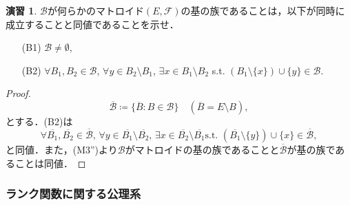 \documentclass[xelatex,ja=standard,a4paper,14pt,everyparhook=compat]{bxjsarticle}
\theoremstyle{definition}
\newtheorem{exercise}{演習}
\begin{document}
\setcounter{exercise}{7}
\begin{exercise}
    $\mathcal{B}$が何らかのマトロイド$(E, \mathcal{F})$の基の族であることは，以下が同時に成立することと同値であることを示せ． \begin{enumerate}
        \item[(B1)] $\mathcal{B} \neq \emptyset$,
        \item[(B2)] $\forall B_1, B_2 \in \mathcal{B}$, $\forall y \in B_2 \setminus B_1$, $\exists x \in B_1 \setminus B_2$ s.t. $(B_1 \setminus \{x\}) \cup \{y\} \in \mathcal{B}$.
    \end{enumerate}
\end{exercise}
\begin{proof}
    \begin{equation*}
        \overline{\mathcal{B}} \coloneqq \{\overline{B} : B \in \mathcal{B}\} \quad (\overline{B} = E \setminus B),
    \end{equation*}
    とする．(B2)は \begin{equation*}
        \text{$\forall \overline{B_1}, \overline{B_2} \in \overline{\mathcal{B}}$,
            $\forall y \in \overline{B_1} \setminus \overline{B_2}$,
            $\exists x \in \overline{B_2} \setminus \overline{B_1}$
            s.t. $(\overline{B_1} \setminus \{y\}) \cup \{x\} \in \overline{\mathcal{B}}$},
    \end{equation*}
    と同値．また，(M3'')より$\mathcal{B}$がマトロイドの基の族であることと$\overline{\mathcal{B}}$が基の族であることは同値．
\end{proof}

\newpage

\subsubsection*{ランク関数に関する公理系}
\end{document}
